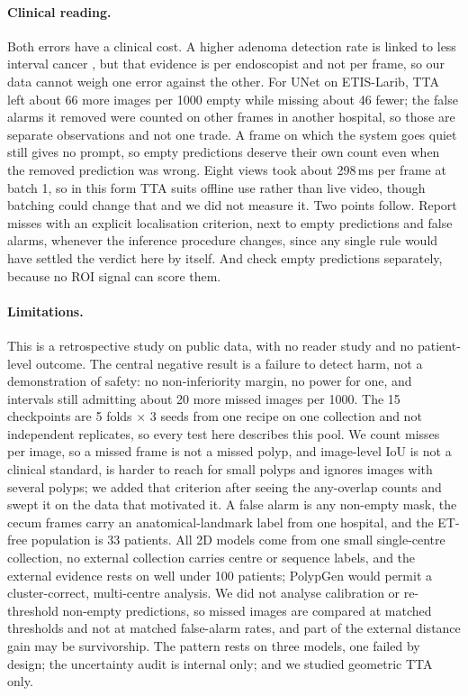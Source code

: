 \paragraph{Clinical reading.} Both errors have a clinical cost. A higher adenoma detection rate is linked to less interval cancer \cite{corley2014adr}, but that evidence is per endoscopist and not per frame, so our data cannot weigh one error against the other. For UNet on ETIS-Larib, TTA left about 66 more images per 1000 empty while missing about 46 fewer; the false alarms it removed were counted on other frames in another hospital, so those are separate observations and not one trade. A frame on which the system goes quiet still gives no prompt, so empty predictions deserve their own count even when the removed prediction was wrong. Eight views took about 298\,ms per frame at batch 1, so in this form TTA suits offline use rather than live video, though batching could change that and we did not measure it. Two points follow. Report misses with an explicit localisation criterion, next to empty predictions and false alarms, whenever the inference procedure changes, since any single rule would have settled the verdict here by itself. And check empty predictions separately, because no ROI signal can score them.

\paragraph{Limitations.} This is a retrospective study on public data, with no reader study and no patient-level outcome. The central negative result is a failure to detect harm, not a demonstration of safety: no non-inferiority margin, no power for one, and intervals still admitting about 20 more missed images per 1000. The 15 checkpoints are 5 folds $\times$ 3 seeds from one recipe on one collection and not independent replicates, so every test here describes this pool. We count misses per image, so a missed frame is not a missed polyp, and image-level IoU is not a clinical standard, is harder to reach for small polyps and ignores images with several polyps; we added that criterion after seeing the any-overlap counts and swept it on the data that motivated it. A false alarm is any non-empty mask, the cecum frames carry an anatomical-landmark label from one hospital, and the ET-free population is 33 patients. All 2D models come from one small single-centre collection, no external collection carries centre or sequence labels, and the external evidence rests on well under 100 patients; PolypGen \cite{ali2023polypgen} would permit a cluster-correct, multi-centre analysis. We did not analyse calibration or re-threshold non-empty predictions, so missed images are compared at matched thresholds and not at matched false-alarm rates, and part of the external distance gain may be survivorship. The pattern rests on three models, one failed by design; the uncertainty audit is internal only; and we studied geometric TTA only.
